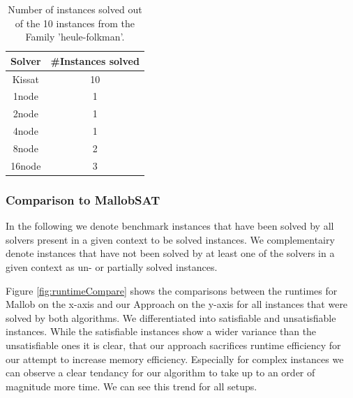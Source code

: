 \documentclass[12pt,a4paper,twoside]{scrartcl}
\numberwithin{equation}{section}
\begin{document}
\begin{table}
  \center
  \begin{tabular}{ c|c }
    Solver  & \#Instances solved\\
    \hline
    Kissat  & 10\\
    \hline
    1node   & 1\\
    \hline
    2node   & 1\\
    \hline
    4node   & 1\\
    \hline
    8node   & 2\\
    \hline
    16node  & 3
  \end{tabular}
  \caption{Number of instances solved out of the 10 instances from the Family 'heule-folkman'.}
  \label{tab:heuleFolkman}
\end{table}

\subsubsection{Comparison to MallobSAT}

In the following we denote benchmark instances that have been solved by all solvers present in a given context to be solved instances. We complementairy denote instances that have not been solved by at least one of the solvers in a given context as un- or partially solved instances.

Figure \ref{fig:runtimeCompare} shows the comparisons between the runtimes for Mallob on the x-axis and our Approach on the y-axis for all instances that were solved by both algorithms. We differentiated into satisfiable and unsatisfiable instances. While the satisfiable instances show a wider variance than the unsatisfiable ones it is clear, that our approach sacrifices runtime efficiency for our attempt to increase memory efficiency. Especially for complex instances we can observe a clear tendancy for our algorithm to take up to an order of magnitude more time. We can see this trend for all setups.
\end{document}
